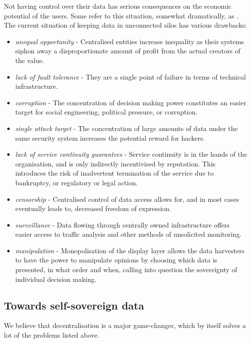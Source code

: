 Not having control over their data has serious consequences on the economic potential of the users. Some refer to this situation, somewhat dramatically, as . 
The current situation of keeping data in unconnected silos has various drawbacks: 

\begin{itemize}
    \item \emph{unequal opportunity} - Centralised entities increase inequality as their systems siphon away a disproportionate amount of profit from the actual creators of the value.
    \item \emph{lack of fault tolerance} - They are a single point of failure in terms of technical infrastructure.
    \item \emph{corruption} - The concentration of decision making power constitutes an easier target for social engineering, political pressure, or corruption.
    \item \emph{single attack target} - The concentration of large amounts of data under the same security system increases the potential reward for hackers. 
    \item \emph{lack of service continuity guarantees} - Service continuity is in the hands of the organisation, and is only indirectly incentivised by reputation. This introduces the risk of inadvertent termination of the service due to bankruptcy, or regulatory or legal action.
    \item \emph{censorship} - Centralised control of data access allows for, and in most cases eventually leads to, decreased freedom of expression.
    \item \emph{surveillance} - Data flowing through centrally owned infrastructure offers easier access to traffic analysis and other methods of unsolicited monitoring.
    \item \emph{manipulation} - Monopolisation of the display layer allows the data harvesters to have the power to manipulate opinions by choosing which data is presented, in what order and when, calling into question the sovereignty of individual decision making.
\end{itemize}


\subsection{Towards self-sovereign data \statusgreen} \label{sec:selfsovereigndata}

We believe that decentralisation is a major game-changer, which by itself solves a lot of the problems listed above.

